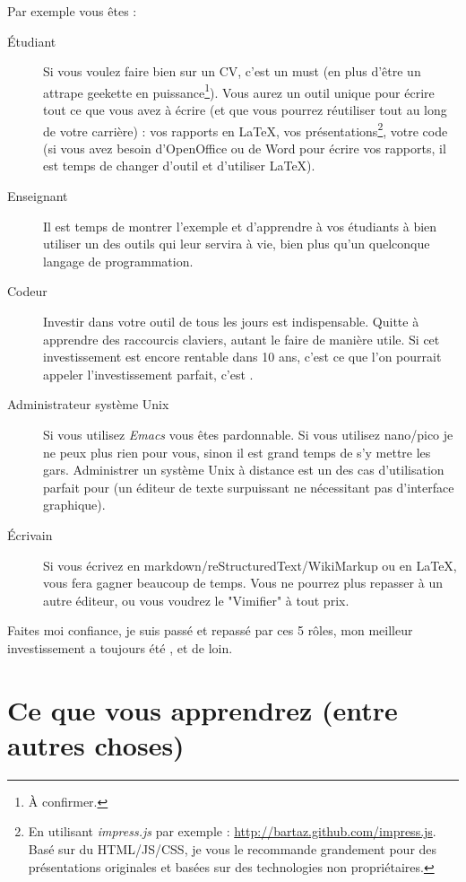 Par exemple vous êtes :
\begin{description}
    \item[Étudiant] Si vous voulez faire bien sur un CV, c'est un must (en plus d'être un attrape geekette en puissance\footnote{À confirmer.}). Vous aurez un outil unique pour écrire tout ce que vous avez à écrire (et que vous pourrez réutiliser tout au long de votre carrière) : vos rapports en \LaTeX, vos présentations\footnote{En utilisant \emph{impress.js} par exemple : \url{http://bartaz.github.com/impress.js}. Basé sur du HTML/JS/CSS, je vous le recommande grandement pour des présentations originales et basées sur des technologies non propriétaires.}, votre code (si vous avez besoin d'OpenOffice ou de Word pour écrire vos rapports, il est temps de changer d'outil et d'utiliser \LaTeX).
    \item[Enseignant] Il est temps de montrer l'exemple et d'apprendre à vos étudiants à bien utiliser un des outils qui leur servira à vie, bien plus qu'un quelconque langage de programmation.
    \item[Codeur] Investir dans votre outil de tous les jours est indispensable. Quitte à apprendre des raccourcis claviers, autant le faire de manière utile. Si cet investissement est encore rentable dans 10 ans, c'est ce que l'on pourrait appeler l'investissement parfait, c'est \vim.
    \item[Administrateur système Unix] Si vous utilisez \emph{Emacs} vous êtes pardonnable. Si vous utilisez nano/pico je ne peux plus rien pour vous, sinon il est grand temps de s'y mettre les gars. Administrer un système Unix à distance est un des cas d'utilisation parfait pour \vim (un éditeur de texte surpuissant ne nécessitant pas d'interface graphique).
    \item[Écrivain] Si vous écrivez en markdown/reStructuredText/WikiMarkup ou en \LaTeX, \vim vous fera gagner beaucoup de temps. Vous ne pourrez plus repasser à un autre éditeur, ou vous voudrez le "Vimifier" à tout prix.
\end{description}

Faites moi confiance, je suis passé et repassé par ces 5 rôles, mon meilleur investissement a toujours été \vim, et de loin.

\section{Ce que vous apprendrez (entre autres choses)}

